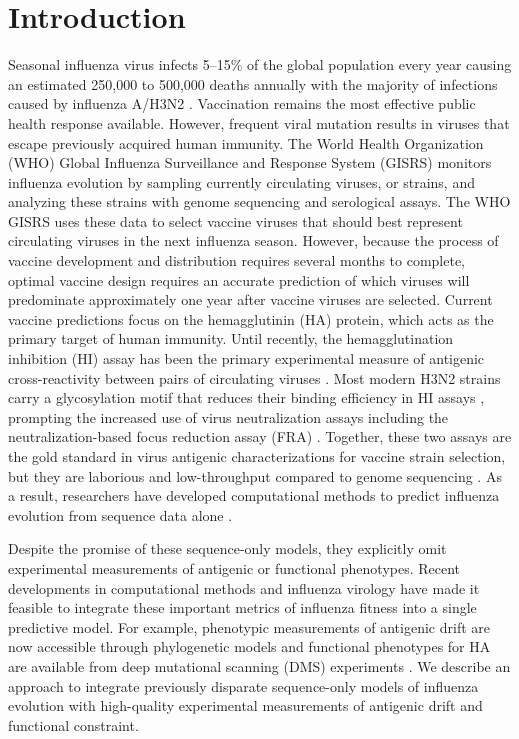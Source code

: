 
\section*{Introduction}

Seasonal influenza virus infects 5--15\% of the global population every year causing an estimated 250,000 to 500,000 deaths annually with the majority of infections caused by influenza A/H3N2 \cite{flufactsheet}.
Vaccination remains the most effective public health response available.
However, frequent viral mutation results in viruses that escape previously acquired human immunity.
The World Health Organization (WHO) Global Influenza Surveillance and Response System (GISRS) monitors influenza evolution by sampling currently circulating viruses, or strains, and analyzing these strains with genome sequencing and serological assays.
The WHO GISRS uses these data to select vaccine viruses that should best represent circulating viruses in the next influenza season.
However, because the process of vaccine development and distribution requires several months to complete, optimal vaccine design requires an accurate prediction of which viruses will predominate approximately one year after vaccine viruses are selected.
Current vaccine predictions focus on the hemagglutinin (HA) protein, which acts as the primary target of human immunity.
Until recently, the hemagglutination inhibition (HI) assay has been the primary experimental measure of antigenic cross-reactivity between pairs of circulating viruses \cite{hirst1943studies}.
Most modern H3N2 strains carry a glycosylation motif that reduces their binding efficiency in HI assays \cite{Chambers:2015jt,Zost2017}, prompting the increased use of virus neutralization assays including the neutralization-based focus reduction assay (FRA) \cite{Okuno:1990uu}.
Together, these two assays are the gold standard in virus antigenic characterizations for vaccine strain selection, but they are laborious and low-throughput compared to genome sequencing \cite{Wood:2012ii}.
As a result, researchers have developed computational methods to predict influenza evolution from sequence data alone \cite{Luksza:2014hj,Steinbruck:2014kq,Neher:2014eu}.

Despite the promise of these sequence-only models, they explicitly omit experimental measurements of antigenic or functional phenotypes.
Recent developments in computational methods and influenza virology have made it feasible to integrate these important metrics of influenza fitness into a single predictive model.
For example, phenotypic measurements of antigenic drift are now accessible through phylogenetic models \cite{Neher:2016hy} and functional phenotypes for HA are available from deep mutational scanning (DMS) experiments \cite{Lee2018}.
We describe an approach to integrate previously disparate sequence-only models of influenza evolution with high-quality experimental measurements of antigenic drift and functional constraint.

